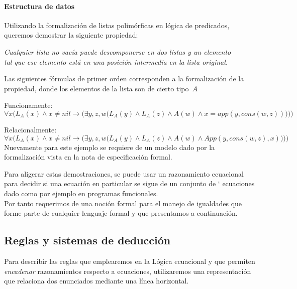 \documentclass[11pt,letterpaper]{article}
\begin{document}

\paragraph{Estructura de datos}
Utilizando la formalizaci\'on de listas polim\'orficas en l\'ogica de 
predicados, queremos demostrar la siguiente propiedad:
\begin{center}
 \textit{Cualquier lista no vac\'ia puede descomponerse en dos listas y un 
elemento\\ tal que ese elemento est\'a en una posici\'on intermedia en la lista 
original.}
\end{center}
Las siguientes f\'ormulas de primer orden corresponden a la formalizaci\'on de 
la propiedad, donde los elementos de la lista son de cierto tipo~$A$ 
\be
\item Funcionamente:
\[
\forall x \Big( L_{A}(x) \land x \neq nil \to 
    \big(\exists y,z,w \big(L_{A}(y) \land L_{A}(z) \land A(w) \land 
      x=app(y,cons(w,z))\big) \big) \Big)
\]
\item Relacionalmente:
\[
\forall x \Big( L_{A}(x) \land x \neq nil \to 
    \big(\exists y,z,w \big(L_{A}(y) \land L_{A}(z) \land A(w) \land 
      App(y,cons(w,z),x)\big) \big) \Big)
\]
\ee
Nuevamente para este ejemplo se requiere de un modelo dado por la 
formalizaci\'on vista en la nota de especificaci\'on formal.


\bigskip


Para aligerar estas demostraciones, se puede usar un razonamiento ecuacional 
para decidir si una ecuaci\'on en particular se sigue de un conjunto de `
ecuaciones dado como por ejemplo en programas funcionales.\\
Por tanto requerimos de una noci\'on formal para el manejo de igualdades que 
forme parte de cualquier lenguaje formal y que presentamos a continuación.

\subsection{Reglas y sistemas de deducci\'on}

Para describir las reglas que emplearemos en la Lógica ecuacional y que 
permiten 
\textit{encadenar} razonamientos respecto a ecuaciones, utilizaremos una 
representaci\'on que relaciona dos enunciados mediante una l\'inea horizontal.
\end{document}

